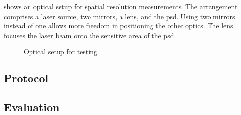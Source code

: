  shows an optical setup for spatial resolution measurements.
The arrangement comprises a laser source, two mirrors, a lens, and the \gls{psd}.
Using two mirrors instead of one allows more freedom in positioning the other optics.
The lens focuses the laser beam onto the sensitive area of the \gls{psd}.

\begin{figure}[htb]
	\centering
	
	\caption{Optical setup for testing}\label{fig:optical_setup}
\end{figure}

\subsection{Protocol}


\subsection{Evaluation}


